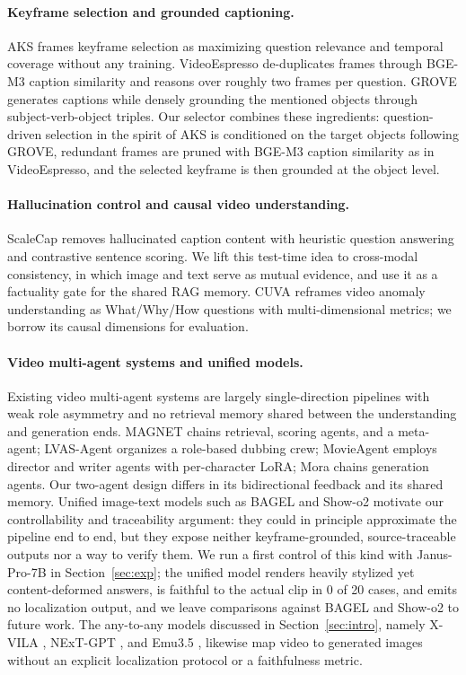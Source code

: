\paragraph{Keyframe selection and grounded captioning.}
AKS \citep{aks2502} frames keyframe selection as maximizing question relevance and temporal coverage without any training. VideoEspresso \citep{videoespresso2411} de-duplicates frames through BGE-M3 caption similarity and reasons over roughly two frames per question. GROVE \citep{grove2503} generates captions while densely grounding the mentioned objects through subject-verb-object triples. Our selector combines these ingredients: question-driven selection in the spirit of AKS is conditioned on the target objects following GROVE, redundant frames are pruned with BGE-M3 caption similarity as in VideoEspresso, and the selected keyframe is then grounded at the object level.

\paragraph{Hallucination control and causal video understanding.}
ScaleCap \citep{scalecap2506} removes hallucinated caption content with heuristic question answering and contrastive sentence scoring. We lift this test-time idea to cross-modal consistency, in which image and text serve as mutual evidence, and use it as a factuality gate for the shared RAG memory. CUVA \citep{cuva2405} reframes video anomaly understanding as What/Why/How questions with multi-dimensional metrics; we borrow its causal dimensions for evaluation.

\paragraph{Video multi-agent systems and unified models.}
Existing video multi-agent systems are largely single-direction pipelines with weak role asymmetry and no retrieval memory shared between the understanding and generation ends. MAGNET \citep{magnet2506} chains retrieval, scoring agents, and a meta-agent; LVAS-Agent \citep{lvasagent2503} organizes a role-based dubbing crew; MovieAgent \citep{movieagent2503} employs director and writer agents with per-character LoRA; Mora \citep{mora2403} chains generation agents. Our two-agent design differs in its bidirectional feedback and its shared memory. Unified image-text models such as BAGEL \citep{bagel2505} and Show-o2 \citep{showo22506} motivate our controllability and traceability argument: they could in principle approximate the pipeline end to end, but they expose neither keyframe-grounded, source-traceable outputs nor a way to verify them. We run a first control of this kind with Janus-Pro-7B \citep{januspro2501} in Section~\ref{sec:exp}; the unified model renders heavily stylized yet content-deformed answers, is faithful to the actual clip in 0 of 20 cases, and emits no localization output, and we leave comparisons against BAGEL and Show-o2 to future work. The any-to-any models discussed in Section~\ref{sec:intro}, namely X-VILA \citep{xvila2405}, NExT-GPT \citep{nextgpt2309}, and Emu3.5 \citep{emu352510}, likewise map video to generated images without an explicit localization protocol or a faithfulness metric.

